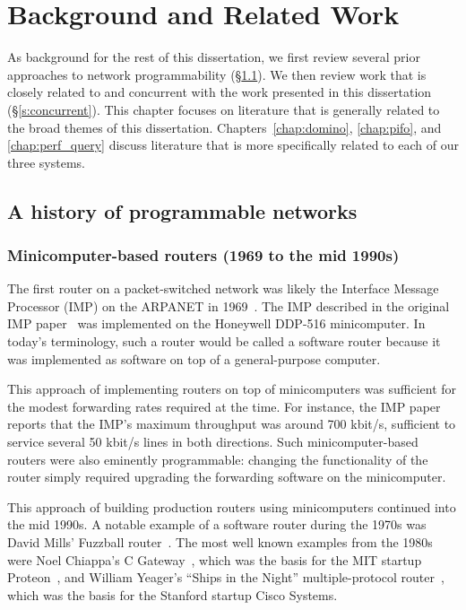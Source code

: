 \chapter{Background and Related Work}
\label{chap:related}

As background for the rest of this dissertation, we first review several prior
approaches to network programmability (\S\ref{s:bgnd_bgnd}). We then review
work that is closely related to and concurrent with the work presented in this
dissertation (\S\ref{s:concurrent}).  This chapter focuses on literature that
is generally related to the broad themes of this dissertation.
Chapters~\ref{chap:domino}, \ref{chap:pifo}, and \ref{chap:perf_query} discuss
literature that is more specifically related to each of our three systems.

\section{A history of programmable networks}
\label{s:bgnd_bgnd}

\subsection{Minicomputer-based routers (1969 to the mid 1990s)}
The first router on a packet-switched network was likely the Interface Message
Processor (IMP) on the ARPANET in 1969~\cite{imp}. The IMP described in the
original IMP paper~\cite{imp} was implemented on the Honeywell DDP-516
minicomputer. In today's terminology, such a router would be called a software
router because it was implemented as software on top of a general-purpose
computer.

This approach of implementing routers on top of minicomputers was sufficient
for the modest forwarding rates required at the time. For instance, the IMP
paper reports that the IMP's maximum throughput was around 700 kbit/s,
sufficient to service several 50 kbit/s lines in both directions.  Such
minicomputer-based routers were also eminently programmable: changing the
functionality of the router simply required upgrading the forwarding software
on the minicomputer.

This approach of building production routers using minicomputers continued into
the mid 1990s.  A notable example of a software router during the 1970s was David
Mills' Fuzzball router~\cite{fuzzball}. The most well known examples from the
1980s were Noel Chiappa's C Gateway~\cite{cgw}, which was the basis for the MIT
startup Proteon~\cite{proteon}, and William Yeager's ``Ships in the Night''
multiple-protocol router~\cite{ships}, which was the basis for the Stanford
startup Cisco Systems.

